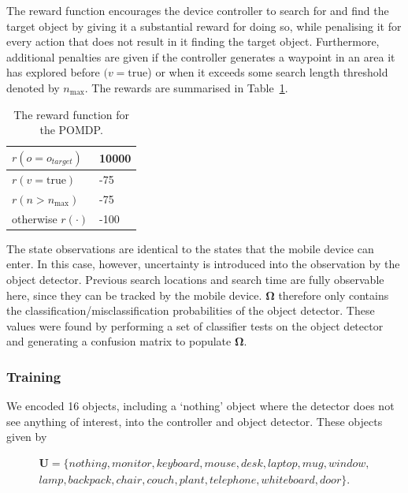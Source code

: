 \documentclass[runningheads]{llncs}
\begin{document}
The reward function encourages the device controller to search for and find the target object by giving it a substantial reward for doing so, while penalising it for every action that does not result in it finding the target object.
Furthermore, additional penalties are given if the controller generates a waypoint in an area it has explored before $(v = \textrm{true}$) or when it exceeds some search length threshold denoted by $n_{\max}$.
The rewards are summarised in Table~\ref{tab:rewards}.

\begin{table}
  \centering
  \caption{The reward function for the POMDP. }\label{tab:rewards}
  \begin{tabular}{p{3cm}p{1cm}}
    \toprule
    $r(o = o_{target})$ & 10000 \\ \midrule
    $r(v = \textrm{true})$  & -75 \\ \midrule
    $r(n > n_{\max})$ & -75 \\ \midrule
    otherwise $r(\cdot)$ & -100  \\ \midrule
    \bottomrule
  \end{tabular}
\end{table}

The state observations are identical to the states that the mobile device can enter. 
In this case, however, uncertainty is introduced into the observation by the object detector.
Previous search locations and search time are fully observable here, since they can be tracked by the mobile device.
$\mathbf{\Omega}$ therefore only contains the classification/misclassification probabilities of the object detector. 
These values were found by performing a set of classifier tests on the object detector and generating a confusion matrix to populate $\mathbf{\Omega}$.

\subsubsection{Training}

We encoded 16 objects, including a `nothing' object where the detector does not see anything of interest, into the controller and object detector.
These objects given by 

\begin{equation*}
  \begin{split}
    \mathbf{U} = \{ nothing, monitor, keyboard, mouse, desk, laptop, mug, window,\\ 
      lamp, backpack, chair, couch, plant, telephone, whiteboard, door \}.
  \end{split}
\end{equation*}
\end{document}
